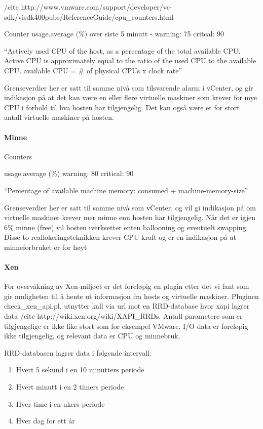  /cite http://www.vmware.com/support/developer/vc-sdk/visdk400pubs/ReferenceGuide/cpu\_counters.html


Counter usage.average (\%) over siste 5 minutt -  warning: 75 critcal: 90 

“Actively used CPU of the host, as a percentage of the total available CPU. Active CPU is approximately equal to the ratio of the used CPU to the available CPU. available CPU = # of physical CPUs x clock rate”

Grenseverdier her er satt til samme nivå som tilsvarende alarm i vCenter, og gir indikasjon på at det kan være en eller flere virtuelle maskiner som krever for mye CPU i forhold til hva hosten har tilgjengelig. Det kan også være et for stort antall virtuelle maskiner på hosten. 

\paragraph{Minne}

Counters 

 usage.average (\%) warning: 80 critical: 90

“Percentage of available machine memory: consumed ÷ machine-memory-size”

Grenseverdier her er satt til samme nivå som vCenter, og vil gi indikasjon på om virtuelle maskiner krever mer minne enn hosten har tilgjengelig. Når det er igjen 6\% minne (free) vil hosten iverksetter enten ballooning og eventuelt swapping. Disse to reallokeringsteknikken krever CPU kraft og er en indikasjon på at minneforbruket er for høyt

\paragraph{Xen}

For overvåkning av Xen-miljøet er det foreløpig en plugin etter det vi fant som gir muligheten til å hente ut informasjon fra hosts og virtuelle maskiner. Pluginen check\_xen\_api.pl, utnytter kall via url mot en RRD-database hvor xapi lagrer data /cite http://wiki.xen.org/wiki/XAPI\_RRDs. 
Antall parametere som er tilgjengelige er ikke like stort som for eksempel VMware. I/O data er foreløpig ikke tilgjengelig, og relevant data er CPU og minnebruk.

RRD-databasen lagrer data i følgende intervall:
\begin{enumerate}
	\item Hvert 5 sekund i en 10 minutters periode
	\item Hvert minutt i en 2 timers periode
	\item Hver time i en ukers periode
	\item Hver dag for ett år
\end{enumerate}

